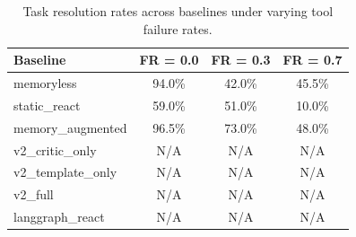 \begin{table}[h]
\centering
\begin{tabular}{lccc}
\hline
Baseline & FR = 0.0 & FR = 0.3 & FR = 0.7 \\
\hline
memoryless & 94.0\% & 42.0\% & 45.5\% \\
static\_react & 59.0\% & 51.0\% & 10.0\% \\
memory\_augmented & 96.5\% & 73.0\% & 48.0\% \\
v2\_critic\_only & N/A & N/A & N/A \\
v2\_template\_only & N/A & N/A & N/A \\
v2\_full & N/A & N/A & N/A \\
langgraph\_react & N/A & N/A & N/A \\
\hline
\end{tabular}
\caption{Task resolution rates across baselines under varying tool failure rates.}
\label{tab:resolution_rates}
\end{table}
